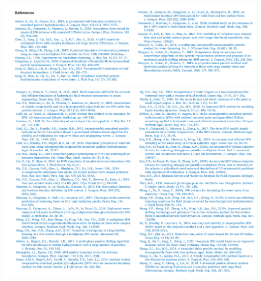 \documentclass[UTF8]{ctexart}
\begin{document}
{
    \centering
    \includegraphics[width=50em]{./source/Fig20.png}\\
    \includegraphics[width=50em]{./source/Fig21.png}
}
\end{document}
